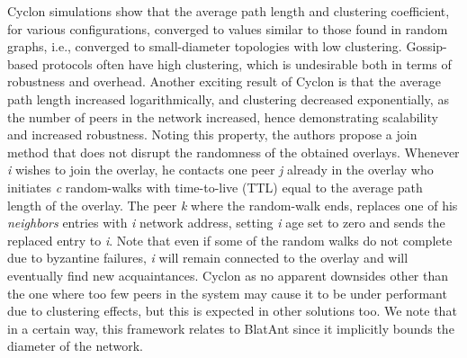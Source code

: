 \documentclass[runningheads]{llncs}
\begin{document}
Cyclon simulations show that the average path length and clustering coefficient, for various configurations, converged to values similar to those found in random graphs, i.e., converged to small-diameter topologies with low clustering. Gossip-based protocols often have high clustering, which is undesirable both in terms of robustness and overhead. Another exciting result of Cyclon is that the average path length increased logarithmically, and clustering decreased exponentially, as the number of peers in the network increased, hence demonstrating scalability and increased robustness. Noting this property, the authors propose a join method that does not disrupt the randomness of the obtained overlays. Whenever \textit{i} wishes to join the overlay, he contacts one peer \textit{j} already in the overlay who initiates \textit{c} random-walks with time-to-live (TTL) equal to the average path length of the overlay. The peer \textit{k} where the random-walk ends, replaces one of his \textit{neighbors} entries with \textit{i} network address, setting \textit{i} age set to zero and sends the replaced entry to \textit{i}. Note that even if some of the random walks do not complete due to byzantine failures, \textit{i} will remain connected to the overlay and will eventually find new acquaintances. Cyclon as no apparent downsides other than the one where too few peers in the system may cause it to be under performant due to clustering effects, but this is expected in other solutions too. We note that in a certain way, this framework relates to BlatAnt since it implicitly bounds the diameter of the network.
\end{document}
